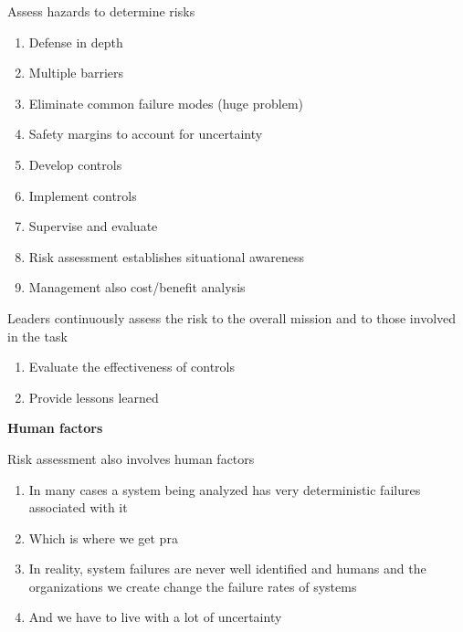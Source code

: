 \documentclass[aspectratio=1610,pdftex,dvipsnames,compress,xcolor={dvipsnames}]{beamer}
\newcommand{\acs}{\acrshort} %
\begin{document}
\addtocounter{framenumber}{-1}
\begin{frame}{Assess hazards to determine risks}
    \begin{enumerate}[series=outerlist,topsep=0pt,itemsep=11pt,leftmargin=*,label=(\arabic*)]
        \item[]Defense in depth   
        \item[]Multiple barriers
        \item[]Eliminate common failure modes (huge problem)
        \item[]Safety margins to account for uncertainty
        \item[]Develop controls  
        \item[]Implement controls  
        \item[]Supervise and evaluate  
        \item[]Risk assessment establishes situational awareness  
        \item[]Management also cost/benefit analysis
    \end{enumerate}
\end{frame}


\begin{frame}{Leaders continuously assess the risk to the overall mission and to those involved in the task}
    \begin{enumerate}[series=outerlist,topsep=0pt,itemsep=21pt,leftmargin=*,label=(\arabic*)]
        \item[]Evaluate the effectiveness of controls
        \item[]Provide lessons learned
    \end{enumerate}
\end{frame}


\begin{frame}[plain]{}
    \centering\LARGE\textbf{Human factors}
\end{frame}


\addtocounter{framenumber}{-1}
\begin{frame}{Risk assessment also involves human factors}
    \begin{enumerate}[series=outerlist,topsep=0pt,itemsep=21pt,leftmargin=*,label=(\arabic*)]
        \item[]In many cases a system being analyzed has very deterministic failures associated with it 
        \item[]Which is where we get \acs{pra}
        \item[]In reality, system failures are never well identified and humans and the organizations we create change the failure rates of systems
        \item[]And we have to live with a lot of uncertainty
    \end{enumerate}
\end{frame}
\end{document}
